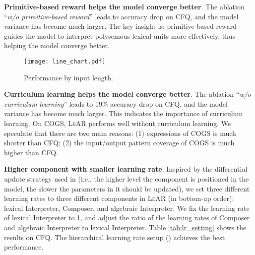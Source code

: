 \documentclass[11pt,a4paper]{article}
\begin{document}
\noindent \textbf{Primitive-based reward helps the model converge better}.
The ablation ``\textit{w/o primitive-based reward}'' leads to  accuracy drop on CFQ, and the model variance has become much larger.
The key insight is: primitive-based reward guides the model to interpret polysemous lexical units more effectively, thus helping the model converge better.


\begin{table}
\centering
{}
\caption{Results of different learning rate ratios  of lexical Interpreter, Composer, and algebraic Interpreter.}
\label{tab:lr_setting}
\end{table}

\begin{figure}[tp]
  \centering
  \texttt{[image: line\_chart.pdf]}
  \caption{Performance by input length.}
  \label{fig:diff_len}
\end{figure}

\noindent \textbf{Curriculum learning helps the model converge better}.
The ablation ``\emph{w/o curriculum learning}'' leads to 19\% accuracy drop on CFQ, and the model variance has become much larger.
This indicates the importance of curriculum learning.
On COGS, \textsc{LeAR} performs well without curriculum learning.
We speculate that there are two main reasons:
(1) expressions of COGS is much shorter than CFQ;
(2) the input/output pattern coverage of COGS is much higher than CFQ.


\noindent \textbf{Higher component with smaller learning rate}. 
Inspired by the differential update strategy used in \citet{liu2020spstru}(i.e., the higher level the component is positioned in the model, the slower the parameters in it should be updated), we set three different learning rates to three different components in \textsc{LeAR} (in bottom-up order): lexical Interpreter, Composer, and algebraic Interpreter.
We fix the learning rate of lexical Interpreter to 1, and adjust the ratio of the learning rates of Composer and algebraic Interpreter to lexical Interpreter.
Table \ref{tab:lr_setting} shows the results on CFQ.
The hierarchical learning rate setup () achieves the best performance.
\end{document}
